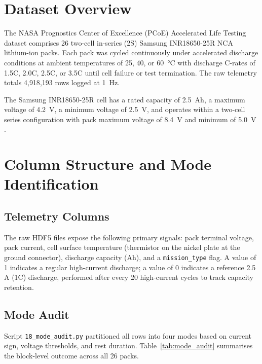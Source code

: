 \label{chap.3}

\section{Dataset Overview}

The NASA Prognostics Center of Excellence (PCoE) Accelerated Life
Testing dataset \cite{fricke2023nasa} comprises 26 two-cell in-series
(2S) Samsung INR18650-25R NCA lithium-ion packs.  Each pack was cycled
continuously under accelerated discharge conditions at ambient
temperatures of 25, 40, or \SI{60}{\degreeCelsius} with discharge
C-rates of 1.5C, 2.0C, 2.5C, or 3.5C until cell failure or test
termination.  The raw telemetry totals 4{,}918{,}193 rows logged
at \SI{1}{Hz}.

The Samsung INR18650-25R cell has a rated capacity of \SI{2.5}{Ah},
a maximum voltage of \SI{4.2}{V}, a minimum voltage of \SI{2.5}{V},
and operates within a two-cell series configuration with pack
maximum voltage of \SI{8.4}{V} and minimum of \SI{5.0}{V}
\cite{samsung2015datasheet}.

\section{Column Structure and Mode Identification}

\subsection{Telemetry Columns}

The raw HDF5 files expose the following primary signals: pack terminal
voltage, pack current, cell surface temperature (thermistor on the
nickel plate at the ground connector), discharge capacity (Ah), and a
\texttt{mission\_type} flag.  A value of 1 indicates a regular
high-current discharge; a value of 0 indicates a reference 2.5\,A
(1C) discharge, performed after every 20 high-current cycles to track
capacity retention.

\subsection{Mode Audit}

Script \texttt{18\_mode\_audit.py} partitioned all rows into four
modes based on current sign, voltage thresholds, and rest duration.
Table~\ref{tab:mode_audit} summarises the block-level outcome across
all 26 packs.

